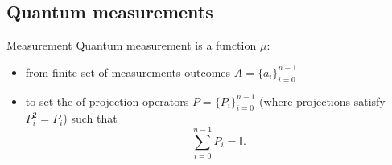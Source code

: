         \subsection{Quantum measurements}
        \begin{frame}{Measurement}
            Quantum measurement is a function $\mu$: 
            \begin{itemize}
                \item from finite set of measurements outcomes $A=\{a_i\}_{i=0}^{n-1}$
                \item to set the of projection operators  $P=\{P_i\}_{i=0}^{n-1}$ (where projections satisfy $P_i^2=P_i$) such that $$	\sum_{i=0}^{n-1} P_i = \mathbb{I}.$$	
            \end{itemize}
        \end{frame}
        
